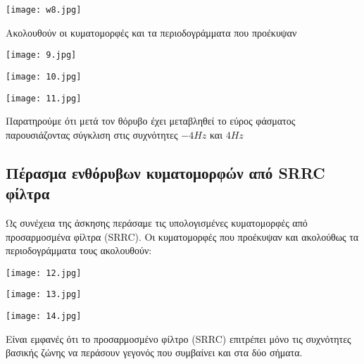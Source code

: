 \documentclass[11pt]{article}
\newcommand{\np}{\newpage}	%
\begin{document}
\begin{center}
	\texttt{[image: w8.jpg]}
\end{center}
\np
Ακολουθούν οι κυματομορφές και τα περιοδογράμματα που προέκυψαν

\begin{center}
	\texttt{[image: 9.jpg]}
\end{center}

\begin{center}
	\texttt{[image: 10.jpg]}
\end{center}

\begin{center}
	\texttt{[image: 11.jpg]}
\end{center}

Παρατηρούμε ότι μετά τον θόρυβο έχει μεταβληθεί το εύρος φάσματος παρουσιάζοντας σύγκλιση στις συχνότητες $-4Hz$ και $4Hz$

\subsection{Πέρασμα ενθόρυβων κυματομορφών από \foreignlanguage{english}{SRRC} φίλτρα}
Ως συνέχεια της άσκησης περάσαμε τις υπολογισμένες κυματομορφές από προσαρμοσμένα φίλτρα (\foreignlanguage{english}{SRRC}). Οι κυματομορφές που προέκυψαν και ακολούθως τα περιοδογράμματα τους ακολουθούν:

\begin{center}
	\texttt{[image: 12.jpg]}
\end{center}

\begin{center}
	\texttt{[image: 13.jpg]}
\end{center}

\begin{center}
	\texttt{[image: 14.jpg]}
\end{center}

Είναι εμφανές ότι το προσαρμοσμένο φίλτρο (\foreignlanguage{english}{SRRC}) επιτρέπει μόνο τις συχνότητες βασικής ζώνης να περάσουν γεγονός που συμβαίνει και στα δύο σήματα.
\end{document}
